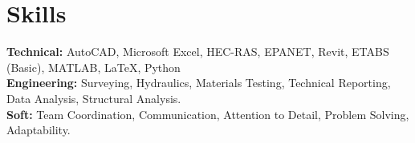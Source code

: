 \documentclass[11pt]{article}
\begin{document}
\section*{Skills}
\small{
\textbf{Technical:} AutoCAD, Microsoft Excel, HEC-RAS, EPANET, Revit, ETABS (Basic), MATLAB, LaTeX, Python \\
\textbf{Engineering:} Surveying, Hydraulics, Materials Testing, Technical Reporting, Data Analysis, Structural Analysis.  \\
\textbf{Soft:} Team Coordination, Communication, Attention to Detail, Problem Solving, Adaptability. 
}
\end{document}
